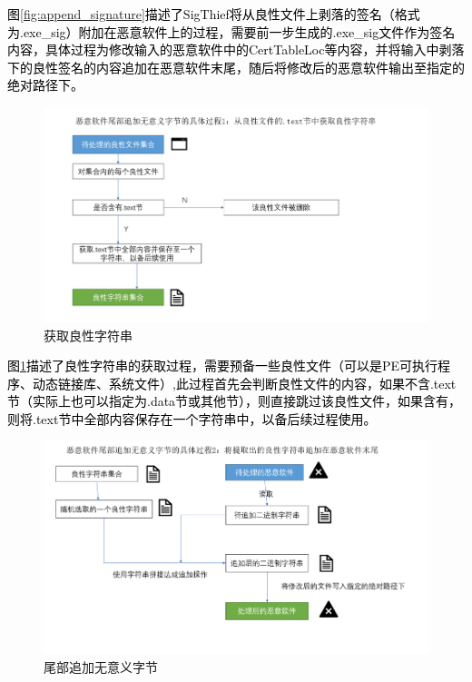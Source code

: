 \textcolor{black}{图\ref{fig:append_signature}描述了SigThief将从良性文件上剥落的签名（格式为.exe\_sig）附加在恶意软件上的过程，需要前一步生成的.exe\_sig文件作为签名内容，具体过程为修改输入的恶意软件中的CertTableLoc等内容，并将输入中剥落下的良性签名的内容追加在恶意软件末尾，随后将修改后的恶意软件输出至指定的绝对路径下。}

\begin{figure}[htbp]
  \centering
  \includegraphics[]{images/get_benign_strings.png}
  \caption{获取良性字符串}\label{fig:get_benign_strings}
\end{figure}

\textcolor{black}{图\ref{fig:get_benign_strings}描述了良性字符串的获取过程，需要预备一些良性文件（可以是PE可执行程序、动态链接库、系统文件）,此过程首先会判断良性文件的内容，如果不含.text节（实际上也可以指定为.data节或其他节），则直接跳过该良性文件，如果含有，则将.text节中全部内容保存在一个字符串中，以备后续过程使用。}

\begin{figure}[htbp]
  \centering
  \includegraphics[]{images/append_strings.png}
  \caption{尾部追加无意义字节}\label{fig:append_strings}
\end{figure}

